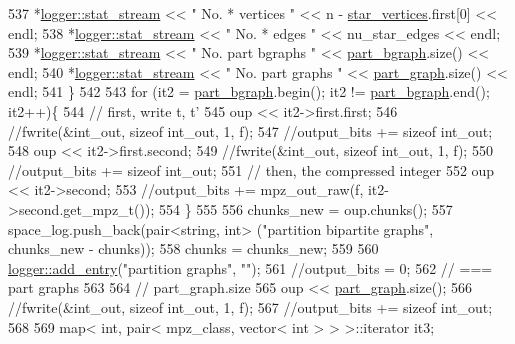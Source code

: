 \begin{DoxyCode}
537     *\hyperlink{classlogger_a7db37821f875f2ba3540980b355779f5}{logger::stat\_stream} << \textcolor{stringliteral}{" No. * vertices    "} << n - 
      \hyperlink{classmarked__graph__compressed_a7a4ced4586e2e353f9076bd447df5208}{star\_vertices}.first[0] << endl;
538     *\hyperlink{classlogger_a7db37821f875f2ba3540980b355779f5}{logger::stat\_stream} << \textcolor{stringliteral}{" No. * edges       "} << nu\_star\_edges << endl;
539     *\hyperlink{classlogger_a7db37821f875f2ba3540980b355779f5}{logger::stat\_stream} << \textcolor{stringliteral}{" No. part bgraphs  "} << 
      \hyperlink{classmarked__graph__compressed_a7b3267063fba30b45eb21b3ba4e07536}{part\_bgraph}.size() << endl;
540     *\hyperlink{classlogger_a7db37821f875f2ba3540980b355779f5}{logger::stat\_stream} << \textcolor{stringliteral}{" No. part graphs   "} << 
      \hyperlink{classmarked__graph__compressed_ae179a4737e6eab905c18a94d44ef64b7}{part\_graph}.size() << endl;
541   \}
542 
543   \textcolor{keywordflow}{for} (it2 = \hyperlink{classmarked__graph__compressed_a7b3267063fba30b45eb21b3ba4e07536}{part\_bgraph}.begin(); it2 != \hyperlink{classmarked__graph__compressed_a7b3267063fba30b45eb21b3ba4e07536}{part\_bgraph}.end(); it2++)\{
544     \textcolor{comment}{// first, write t, t'}
545     oup << it2->first.first;
546     \textcolor{comment}{//fwrite(&int\_out, sizeof int\_out, 1, f);}
547     \textcolor{comment}{//output\_bits += sizeof int\_out;}
548     oup <<  it2->first.second;
549     \textcolor{comment}{//fwrite(&int\_out, sizeof int\_out, 1, f);}
550     \textcolor{comment}{//output\_bits += sizeof int\_out;}
551     \textcolor{comment}{// then, the compressed integer}
552     oup << it2->second;
553     \textcolor{comment}{//output\_bits += mpz\_out\_raw(f, it2->second.get\_mpz\_t());}
554   \}
555 
556   chunks\_new = oup.chunks();
557   space\_log.push\_back(pair<string, int> (\textcolor{stringliteral}{"partition bipartite graphs"}, chunks\_new - chunks));
558   chunks = chunks\_new;
559 
560   \hyperlink{classlogger_a710163deb17bc81f70d53d285b8ac9ac}{logger::add\_entry}(\textcolor{stringliteral}{"partition graphs"}, \textcolor{stringliteral}{""});
561   \textcolor{comment}{//output\_bits = 0;}
562   \textcolor{comment}{// === part graphs}
563 
564   \textcolor{comment}{// part\_graph.size}
565   oup <<  \hyperlink{classmarked__graph__compressed_ae179a4737e6eab905c18a94d44ef64b7}{part\_graph}.size();
566   \textcolor{comment}{//fwrite(&int\_out, sizeof int\_out, 1, f);}
567   \textcolor{comment}{//output\_bits += sizeof int\_out;}
568 
569   map< int, pair< mpz\_class, vector< int > > >::iterator it3;

\end{DoxyCode}
